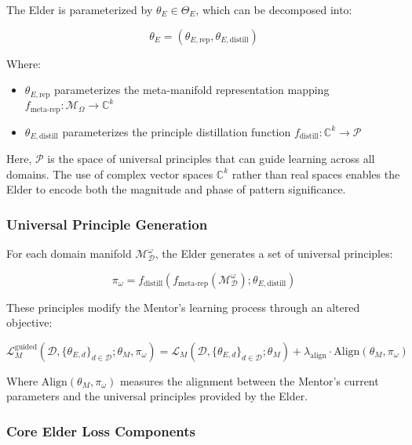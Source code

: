 The Elder is parameterized by $\theta_E \in \Theta_E$, which can be decomposed into:

\begin{equation}
\theta_E = (\theta_{E,\text{rep}}, \theta_{E,\text{distill}})
\end{equation}

Where:
\begin{itemize}
\item $\theta_{E,\text{rep}}$ parameterizes the meta-manifold representation mapping $f_{\text{meta-rep}} : \mathcal{M}_{\Omega} \rightarrow \mathbb{C}^{k}$
\item $\theta_{E,\text{distill}}$ parameterizes the principle distillation function $f_{\text{distill}} : \mathbb{C}^{k} \rightarrow \mathcal{P}$
\end{itemize}

Here, $\mathcal{P}$ is the space of universal principles that can guide learning across all domains. The use of complex vector spaces $\mathbb{C}^{k}$ rather than real spaces enables the Elder to encode both the magnitude and phase of pattern significance.

\subsubsection{Universal Principle Generation}

For each domain manifold $\mathcal{M}_{\mathcal{D}}^{\omega}$, the Elder generates a set of universal principles:

\begin{equation}
\pi_{\omega} = f_{\text{distill}}(f_{\text{meta-rep}}(\mathcal{M}_{\mathcal{D}}^{\omega}); \theta_{E,\text{distill}})
\end{equation}

These principles modify the Mentor's learning process through an altered objective:

\begin{equation}
\mathcal{L}_{M}^{\text{guided}}(\mathcal{D}, \{\theta_{E,d}\}_{d \in \mathcal{D}}; \theta_M, \pi_{\omega}) = \mathcal{L}_M(\mathcal{D}, \{\theta_{E,d}\}_{d \in \mathcal{D}}; \theta_M) + \lambda_{\text{align}} \cdot \text{Align}(\theta_M, \pi_{\omega})
\end{equation}

Where $\text{Align}(\theta_M, \pi_{\omega})$ measures the alignment between the Mentor's current parameters and the universal principles provided by the Elder.

\subsubsection{Core Elder Loss Components}

